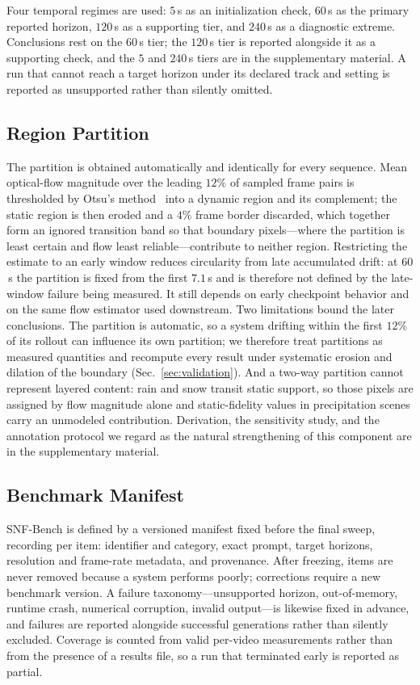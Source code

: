 Four temporal regimes are used: $5$\,s as an initialization check, $60$\,s as the primary reported horizon, $120$\,s as a supporting tier, and $240$\,s as a diagnostic extreme. Conclusions rest on the $60$\,s tier; the $120$\,s tier is reported alongside it as a supporting check, and the $5$ and $240$\,s tiers are in the supplementary material. A run that cannot reach a target horizon under its declared track and setting is reported as unsupported rather than silently omitted.

\subsection{Region Partition}
\label{sec:masks}
The partition is obtained automatically and identically for every sequence. Mean optical-flow magnitude over the leading $12\%$ of sampled frame pairs is thresholded by Otsu's method~\cite{otsu1979threshold} into a dynamic region and its complement; the static region is then eroded and a $4\%$ frame border discarded, which together form an ignored transition band so that boundary pixels---where the partition is least certain and flow least reliable---contribute to neither region. Restricting the estimate to an early window reduces circularity from late accumulated drift: at $60$\,s the partition is fixed from the first $7.1$\,s and is therefore not defined by the late-window failure being measured. It still depends on early checkpoint behavior and on the same flow estimator used downstream. Two limitations bound the later conclusions. The partition is automatic, so a system drifting within the first $12\%$ of its rollout can influence its own partition; we therefore treat partitions as measured quantities and recompute every result under systematic erosion and dilation of the boundary (Sec.~\ref{sec:validation}). And a two-way partition cannot represent layered content: rain and snow transit static support, so those pixels are assigned by flow magnitude alone and static-fidelity values in precipitation scenes carry an unmodeled contribution. Derivation, the sensitivity study, and the annotation protocol we regard as the natural strengthening of this component are in the supplementary material.

\subsection{Benchmark Manifest}
\label{sec:manifest}
SNF-Bench is defined by a versioned manifest fixed before the final sweep, recording per item: identifier and category, exact prompt, target horizons, resolution and frame-rate metadata, and provenance. After freezing, items are never removed because a system performs poorly; corrections require a new benchmark version. A failure taxonomy---unsupported horizon, out-of-memory, runtime crash, numerical corruption, invalid output---is likewise fixed in advance, and failures are reported alongside successful generations rather than silently excluded. Coverage is counted from valid per-video measurements rather than from the presence of a results file, so a run that terminated early is reported as partial.

